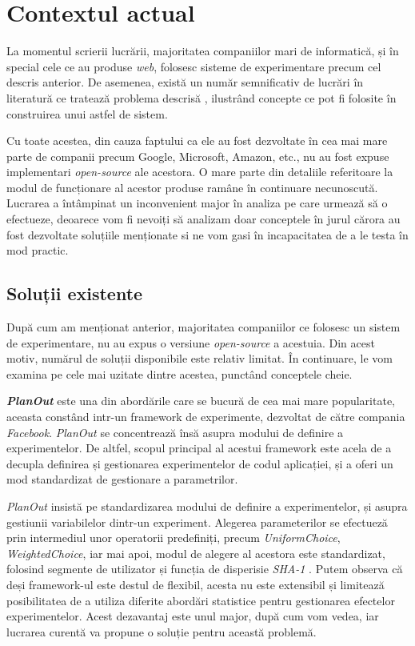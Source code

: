 \section{Contextul actual}

La momentul scrierii lucrării, majoritatea companiilor mari de informatică, și în special cele ce au produse \textit{web}, folosesc sisteme de experimentare precum cel descris anterior. De asemenea,  există un număr semnificativ de lucrări în literatură ce tratează problema descrisă \cite{overlapgoogle} \cite{multiarmeconomy}, ilustrând concepte ce pot fi folosite în construirea unui astfel de sistem. 

Cu toate acestea, din cauza faptului ca ele au fost dezvoltate în cea mai mare parte de companii precum Google, Microsoft, Amazon, etc., nu au fost expuse implementari \textit{open-source} ale acestora. O mare parte din detaliile referitoare la modul de funcționare al acestor produse ramâne în continuare necunoscută. Lucrarea a întâmpinat un inconvenient major în analiza pe care urmează să o efectueze, deoarece vom fi nevoiți să analizam doar conceptele în jurul cărora au fost dezvoltate soluțiile menționate si ne vom gasi în incapacitatea de a le testa în mod practic.

\subsection{Soluții existente}

După cum am menționat anterior, majoritatea companiilor ce folosesc un sistem de experimentare, nu au expus o versiune \textit{open-source} a acestuia. Din acest motiv, numărul de soluții disponibile este relativ limitat. În continuare, le vom examina pe cele mai uzitate dintre acestea, punctând conceptele cheie.

\textit{\textbf{PlanOut}} este una din abordările care se bucură de cea mai mare popularitate, aceasta constând intr-un framework de experimente, dezvoltat de către compania \textit{Facebook}. \textit{PlanOut} se concentrează însă asupra modului de definire a experimentelor. De altfel, scopul principal al acestui framework este acela de a decupla definirea și gestionarea experimentelor de codul aplicației, și a oferi un mod standardizat de gestionare a parametrilor. 

\textit{PlanOut} insistă pe standardizarea modului de definire a experimentelor, și asupra gestiunii variabilelor dintr-un experiment. Alegerea parameterilor se efectueză prin intermediul unor operatorii predefiniți, precum \textit{UniformChoice}, \textit{WeightedChoice}, iar mai apoi, modul de alegere al acestora este standardizat, folosind segmente de utilizator și funcția de disperisie \textit{SHA-1}  \cite{planout}. Putem observa că deși framework-ul este destul de flexibil, acesta nu este extensibil și limitează posibilitatea de a utiliza diferite abordări statistice pentru gestionarea efectelor experimentelor. Acest dezavantaj este unul major, după cum vom vedea, iar lucrarea curentă va propune o soluție pentru această problemă. 

